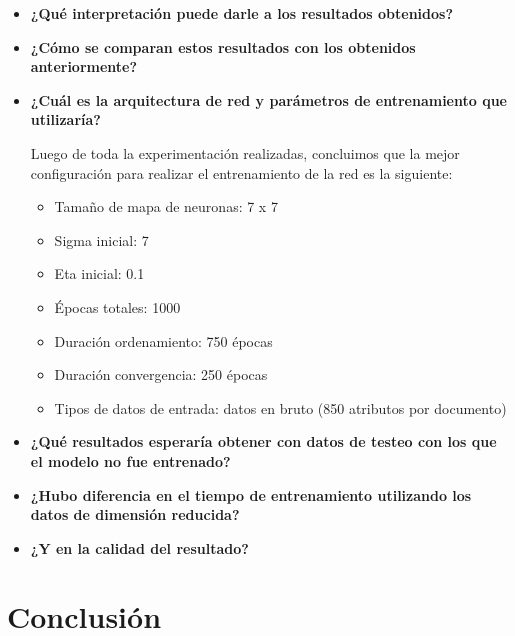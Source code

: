 \begin{itemize}

\item \textbf{¿Qué interpretación puede darle a los resultados obtenidos?} 

\item \textbf{¿Cómo se comparan estos resultados con los obtenidos anteriormente?}

\item \textbf{¿Cuál es la arquitectura de red y parámetros de entrenamiento que utilizaría?}

Luego de toda la experimentación realizadas, concluimos que la mejor configuración para realizar el entrenamiento de 
la red es la siguiente:

\begin{itemize}
\item Tamaño de mapa de neuronas: 7 x 7
\item Sigma inicial: 7
\item Eta inicial: 0.1
\item Épocas totales: 1000
\item Duración ordenamiento: 750 épocas
\item Duración convergencia: 250 épocas
\item Tipos de datos de entrada: datos en bruto (850 atributos por documento)
\end{itemize}

\item \textbf{¿Qué resultados esperaría obtener con datos de testeo con los que el modelo no fue entrenado?}

\item \textbf{¿Hubo diferencia en el tiempo de entrenamiento utilizando los datos de dimensión reducida?}

\item \textbf{¿Y en la calidad del resultado?}

\end{itemize}

\newpage
\section{Conclusión}



